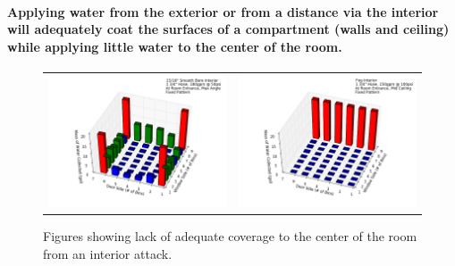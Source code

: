 \documentclass{article}
\begin{document}
\clearpage

\paragraph{Applying water from the exterior or from a distance via the interior will adequately coat the surfaces of a compartment (walls and ceiling) while applying little water to the center of the room.} \mbox{}


\begin{figure}[ht]
\begin{tabular*}{\textwidth}{lr}
\includegraphics[width=3.2in]{../ADD_Analysis/Figures/15-12-09_145932_Datafile_15_16in_Smooth_Bore_Interior.png} &
\includegraphics[width=3.2in]{../ADD_Analysis/Figures/15-12-09_113802_Datafile_Fog_Interior.png} \\
\end{tabular*}
\caption{Figures showing lack of adequate coverage to the center of the room from an interior attack.}
\label{fig:Lack_of_Center_Coverage_Interior}
\end{figure}

\end{document}
